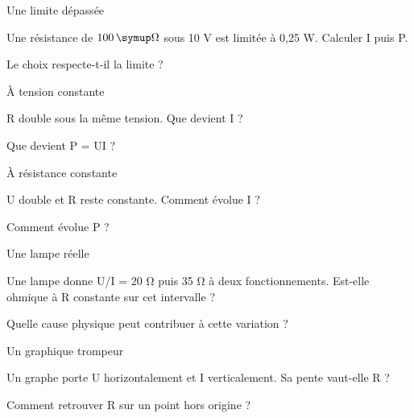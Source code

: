 \par\noindent\begin{minipage}{\linewidth}
\begin{exercice}[2]{Une limite dépassée}
\begin{questions}
\item Une résistance de $100\unite\Omega$ sous 10 V est limitée à 0,25 W. Calculer I puis P.
\item Le choix respecte-t-il la limite ?
\end{questions}
\end{exercice}
\end{minipage}
\par\noindent\begin{minipage}{\linewidth}
\begin{exercice}[2]{À tension constante}
\begin{questions}
\item R double sous la même tension. Que devient I ?
\item Que devient P = UI ?
\end{questions}
\end{exercice}
\end{minipage}
\clearpage{}
\par\noindent\begin{minipage}{\linewidth}
\begin{exercice}[3]{À résistance constante}
\begin{questions}
\item U double et R reste constante. Comment évolue I ?
\item Comment évolue P ?
\end{questions}
\end{exercice}
\end{minipage}
\par\noindent\begin{minipage}{\linewidth}
\begin{exercice}[3]{Une lampe réelle}
\begin{questions}
\item Une lampe donne U/I = 20 Ω puis 35 Ω à deux fonctionnements. Est-elle ohmique à R constante sur cet intervalle ?
\item Quelle cause physique peut contribuer à cette variation ?
\end{questions}
\end{exercice}
\end{minipage}
\par\noindent\begin{minipage}{\linewidth}
\begin{exercice}[3]{Un graphique trompeur}
\begin{questions}
\item Un graphe porte U horizontalement et I verticalement. Sa pente vaut-elle R ?
\item Comment retrouver R sur un point hors origine ?
\end{questions}
\end{exercice}
\end{minipage}
